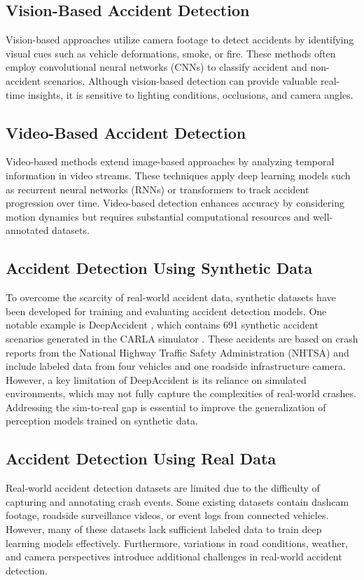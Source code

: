 \subsection{Vision-Based Accident Detection}
Vision-based approaches \cite{fang_vision-based_2024} utilize camera footage to detect accidents by identifying visual cues such as vehicle deformations, smoke, or fire. These methods often employ convolutional neural networks (CNNs) to classify accident and non-accident scenarios. Although vision-based detection can provide valuable real-time insights, it is sensitive to lighting conditions, occlusions, and camera angles.

\subsection{Video-Based Accident Detection}
Video-based methods \cite{maaloul_adaptive_2017} extend image-based approaches by analyzing temporal information in video streams. These techniques apply deep learning models such as recurrent neural networks (RNNs) or transformers to track accident progression over time. Video-based detection enhances accuracy by considering motion dynamics but requires substantial computational resources and well-annotated datasets.

\subsection{Accident Detection Using Synthetic Data}
To overcome the scarcity of real-world accident data, synthetic datasets have been developed for training and evaluating accident detection models. One notable example is DeepAccident \cite{wang2024deepaccident}, which contains 691 synthetic accident scenarios generated in the CARLA simulator \cite{dosovitskiy_carla_2017}. These accidents are based on crash reports from the National Highway Traffic Safety Administration (NHTSA) and include labeled data from four vehicles and one roadside infrastructure camera. However, a key limitation of DeepAccident is its reliance on simulated environments, which may not fully capture the complexities of real-world crashes. Addressing the sim-to-real gap is essential to improve the generalization of perception models trained on synthetic data.

\subsection{Accident Detection Using Real Data}
Real-world accident detection datasets are limited due to the difficulty of capturing and annotating crash events. Some existing datasets contain dashcam footage, roadside surveillance videos, or event logs from connected vehicles. However, many of these datasets lack sufficient labeled data to train deep learning models effectively. Furthermore, variations in road conditions, weather, and camera perspectives introduce additional challenges in real-world accident detection.


